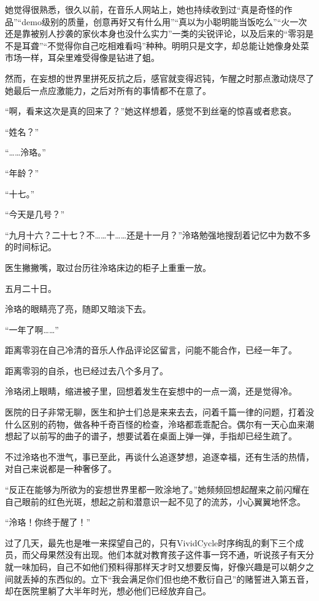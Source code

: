 \documentclass[UTF8, scheme = chinese, openany]{ctexbook}
\begin{document}
她觉得很熟悉，很久以前，在音乐人网站上，她也持续收到过“真是奇怪的作品”“demo级别的质量，创意再好又有什么用”“真以为小聪明能当饭吃么”“火一次还是靠被别人抄袭的家伙本身也没什么实力”一类的尖锐评论，以及后来的“零羽是不是耳聋”“不觉得你自己吃相难看吗”种种。明明只是文字，却总能让她像身处菜市场一样，耳朵里难受得像是钻进了蛆。

然而，在妄想的世界里拼死反抗之后，感官就变得迟钝，乍醒之时那点激动烧尽了她最后一点应激能力，之后对所有的事情都不在意了。

“啊，看来这次是真的回来了？”她这样想着，感觉不到丝毫的惊喜或者悲哀。

“姓名？”

“……泠珞。”

“年龄？”

“十七。”

“今天是几号？”

“九月十六？二十七？不……十……还是十一月？”泠珞勉强地搜刮着记忆中为数不多的时间标记。

医生撇撇嘴，取过台历往泠珞床边的柜子上重重一放。

五月二十日。

泠珞的眼睛亮了亮，随即又暗淡下去。

“一年了啊……”

距离零羽在自己冷清的音乐人作品评论区留言，问能不能合作，已经一年了。

距离零羽的自杀，也已经过去八个多月了。

泠珞闭上眼睛，缩进被子里，回想着发生在妄想中的一点一滴，还是觉得冷。

医院的日子非常无聊，医生和护士们总是来来去去，问着千篇一律的问题，打着没什么区别的药物，做各种千奇百怪的检查，泠珞都乖乖配合。偶尔有一天心血来潮想起了以前写的曲子的谱子，想要试着在桌面上弹一弹，手指却已经生疏了。

不过泠珞也不泄气，事已至此，再谈什么追逐梦想，追逐幸福，还有生活的热情，对自己来说都是一种奢侈了。

“反正在能够为所欲为的妄想世界里都一败涂地了。”她频频回想起醒来之前闪耀在自己眼前的红色光斑，想起之前和潜意识一起不见了的流苏，小心翼翼地怀念。

“泠珞！你终于醒了！”

过了几天，最先也是唯一来探望自己的，只有VividCycle时序绚乱的剩下三个成员，而父母果然没有出现。他们本就对教育孩子这件事一窍不通，听说孩子有天分就一味加码，自己不如他们预料得那样天才时又想要反悔，好像兴趣是可以朝夕之间就丢掉的东西似的。立下“我会满足你们但也绝不敷衍自己”的赌誓进入第五音，却在医院里躺了大半年时光，想必他们已经放弃自己。
\end{document}
